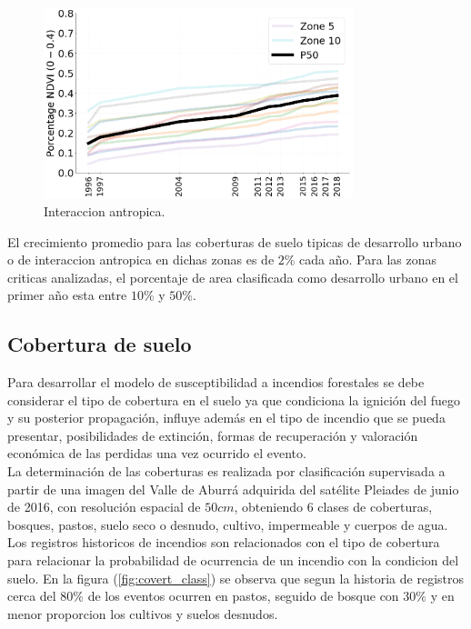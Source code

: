 \begin{figure}[h]
\centering
\includegraphics[trim={0.2cm 0cm 0.2cm 0cm},clip,width=9.0cm]{Figuras/porc_ndvi.png}
\caption{Interaccion antropica.}
\label{fig:porc_ndvi}
\end{figure}

El crecimiento promedio para las coberturas de suelo tipicas de desarrollo urbano o de interaccion antropica en dichas zonas es de $2\%$ cada año. Para las zonas criticas analizadas, el porcentaje de area clasificada como desarrollo urbano en el primer año esta entre $10\%$ y $50\%$.

\subsection*{Cobertura de suelo}

Para desarrollar el modelo de susceptibilidad a incendios forestales se debe considerar el tipo de cobertura en el suelo ya que condiciona la ignición del fuego y su posterior propagación, influye además en el tipo de incendio que se pueda presentar, posibilidades de extinción, formas de recuperación y valoración económica de las perdidas una vez ocurrido el evento.\\

La determinación de las coberturas es realizada por clasificación supervisada a partir de una imagen del Valle de Aburrá adquirida del satélite Pleiades de junio de 2016, con resolución espacial de $50cm$, obteniendo 6 clases de coberturas, bosques, pastos, suelo seco o desnudo, cultivo, impermeable y cuerpos de agua. Los registros historicos de incendios son relacionados con el tipo de cobertura para relacionar la probabilidad de ocurrencia de un incendio con la condicion del suelo. En la figura (\ref{fig:covert_class}) se observa que segun la historia de registros cerca del $80\%$ de los eventos ocurren en pastos, seguido de bosque con $30\%$ y en menor proporcion los cultivos y suelos desnudos.\\

